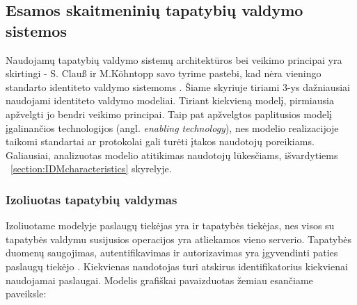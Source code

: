 

\subsection{Esamos skaitmeninių tapatybių valdymo sistemos}

Naudojamų tapatybių valdymo sistemų architektūros bei veikimo principai yra skirtingi -  S. Clauß ir M.Köhntopp savo tyrime pastebi,
kad nėra vieningo standarto identiteto valdymo sistemoms \cite{Claus2001}. Šiame skyriuje tiriami 3-ys dažniausiai naudojami identiteto valdymo
modeliai. Tiriant kiekvieną modelį, pirmiausia apžvelgti jo bendri veikimo principai. Taip pat apžvelgtos paplitusios modelį įgalinančios technologijos
(angl. \textit{enabling technology}),
nes modelio realizacijoje taikomi standartai ar protokolai gali turėti įtakos naudotojų poreikiams. Galiausiai, analizuotas modelio atitikimas naudotojų lūkesčiams,
išvardytiems ~\ref{section:IDMcharacteristics} skyrelyje.

\subsubsection{Izoliuotas tapatybių valdymas}


Izoliuotame modelyje paslaugų tiekėjas yra ir tapatybės tiekėjas, nes visos su tapatybės valdymu
susijusios operacijos yra atliekamos vieno serverio. Tapatybės duomenų saugojimas, autentifikavimas
ir autorizavimas yra įgyvendinti paties paslaugų tiekėjo \cite{Cao2010}. Kiekvienas naudotojas turi atskirus identifikatorius
kiekvienai naudojamai paslaugai. Modelis grafiškai pavaizduotas žemiau esančiame paveiksle:

